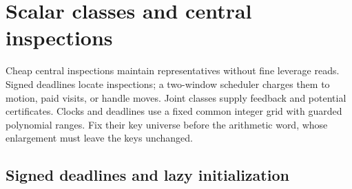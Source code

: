 \documentclass[11pt]{article}
\theoremstyle{remark}
\begin{document}
\section{Scalar classes and central inspections}
\label{sec:ram-scalar-metadata}

Cheap central inspections maintain representatives without fine leverage reads.
Signed deadlines locate inspections; a two-window scheduler charges them to
motion, paid visits, or handle moves.
Joint classes supply feedback and potential certificates.
Clocks and deadlines use a fixed common integer grid with guarded polynomial
ranges.
Fix their key universe before the arithmetic word, whose enlargement must leave
the keys unchanged.

\subsection{Signed deadlines and lazy initialization}
\end{document}
